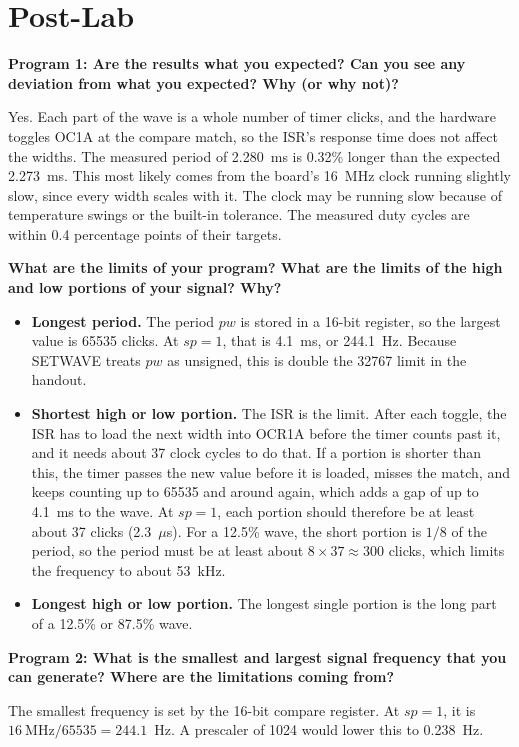 \documentclass[11pt]{article}
\newcommand{\question}[1]{\par\medskip\noindent\textbf{#1}\par\noindent\ignorespaces}
\begin{document}
\section{Post-Lab}
\question{Program 1: Are the results what you expected? Can you see any deviation from what you expected? Why (or why not)?}
Yes. Each part of the wave is a whole number of timer clicks, and the hardware toggles OC1A at the compare match, so the ISR's response time does not affect the widths. The measured period of 2.280~ms is 0.32\% longer than the expected 2.273~ms. This most likely comes from the board's 16~MHz clock running slightly slow, since every width scales with it. The clock may be running slow because of temperature swings or the built-in tolerance. The measured duty cycles are within 0.4 percentage points of their targets.

\question{What are the limits of your program? What are the limits of the high and low portions of your signal? Why?}
\begin{itemize}
\item \textbf{Longest period.} The period $pw$ is stored in a 16-bit register, so the largest value is 65535 clicks. At $sp = 1$, that is 4.1~ms, or 244.1~Hz. Because SETWAVE treats $pw$ as unsigned, this is double the 32767 limit in the handout.
\item \textbf{Shortest high or low portion.} The ISR is the limit. After each toggle, the ISR has to load the next width into OCR1A before the timer counts past it, and it needs about 37 clock cycles to do that. If a portion is shorter than this, the timer passes the new value before it is loaded, misses the match, and keeps counting up to 65535 and around again, which adds a gap of up to 4.1~ms to the wave. At $sp = 1$, each portion should therefore be at least about 37 clicks (2.3~$\mu$s). For a 12.5\% wave, the short portion is $1/8$ of the period, so the period must be at least about $8 \times 37 \approx 300$ clicks, which limits the frequency to about 53~kHz.
\item \textbf{Longest high or low portion.} The longest single portion is the long part of a 12.5\% or 87.5\% wave.
\end{itemize}

\question{Program 2: What is the smallest and largest signal frequency that you can generate? Where are the limitations coming from?}
The smallest frequency is set by the 16-bit compare register. At $sp = 1$, it is $16~\text{MHz} / 65535 = 244.1$~Hz. A prescaler of 1024 would lower this to 0.238~Hz.
\end{document}
